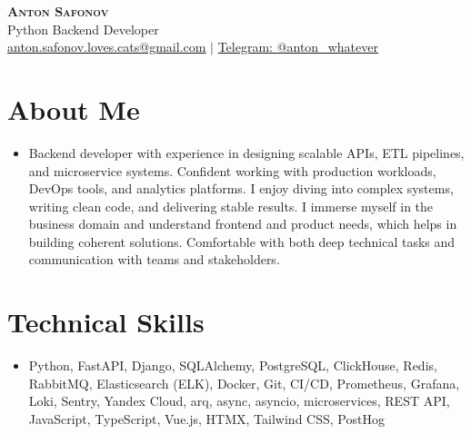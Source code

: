 \documentclass[letterpaper,11pt]{article}
\begin{document}
\vspace*{-50pt}

\begin{center}
    \textbf{\huge \scshape Anton Safonov} \\ \vspace{-1pt}
    \large Python Backend Developer \\ \vspace{-1pt}
    \small \href{mailto:anton.safonov.loves.cats@gmail.com}{\underline{anton.safonov.loves.cats@gmail.com}} $|$ 
    \href{https://t.me/anton_whatever}{Telegram: \underline{@anton\_whatever}} 
\end{center}

\section{About Me}
\small\begin{itemize}[leftmargin=0.15in, label={}]
\item{Backend developer with experience in designing scalable APIs, ETL pipelines, and microservice systems. Confident working with production workloads, DevOps tools, and analytics platforms. I enjoy diving into complex systems, writing clean code, and delivering stable results. I immerse myself in the business domain and understand frontend and product needs, which helps in building coherent solutions. Comfortable with both deep technical tasks and communication with teams and stakeholders.}
\end{itemize}
\section{Technical Skills}
 \begin{itemize}[leftmargin=0.15in, label={}]
    \item Python, FastAPI, Django, SQLAlchemy, PostgreSQL, ClickHouse, Redis, RabbitMQ, Elasticsearch (ELK), Docker, Git, CI/CD, Prometheus, Grafana, Loki, Sentry, Yandex Cloud, arq, async, asyncio, microservices, REST API, JavaScript, TypeScript, Vue.js, HTMX, Tailwind CSS, PostHog
 \end{itemize}
\end{document}

